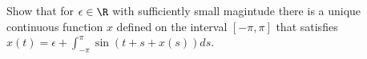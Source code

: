 Show that for $\epsilon\in \R$ with sufficiently small magintude there
is a unique continuous function $x$ defined on the interval
$[-\pi,\pi]$ that satisfies
$x(t)=\epsilon+\int_{-\pi}^{\pi}\sin(t+s+x(s))ds$.

